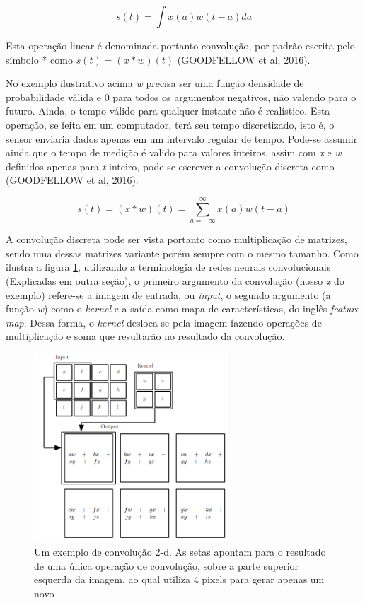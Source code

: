 \documentclass[12pt]{report}
\begin{document}
\begin{equation}
    s(t) = \int x(a)w(t - a)da
\end{equation}

Esta operação linear é denominada portanto convolução, por padrão escrita pelo símbolo * como $s(t) = (x * w) (t)$ (GOODFELLOW et al, 2016).

No exemplo ilustrativo acima \textit{w} precisa ser uma função densidade de probabilidade válida e 0 para todos os argumentos negativos, não valendo para o futuro. Ainda, o tempo válido para qualquer instante não é realístico. Esta operação, se feita em um computador, terá seu tempo discretizado, isto é, o sensor enviaria dados apenas em um intervalo regular de tempo. Pode-se assumir ainda que o tempo de medição é valido para valores inteiros, assim com \textit{x} e \textit{w} definidos apenas para \textit{t} inteiro, pode-se escrever a convolução discreta como (GOODFELLOW et al, 2016):

\begin{equation}
    s(t) = (x*w)(t) = \sum_{a = -\infty}^\infty x(a)w(t - a)
\end{equation}

A convolução discreta pode ser vista portanto como multiplicação de matrizes, sendo uma dessas matrizes variante porém sempre com o mesmo tamanho. Como ilustra a figura \ref{fig:convo}, utilizando a terminologia de redes neurais convolucionais (Explicadas em outra seção), o primeiro argumento da convolução (nosso \textit{x} do exemplo) refere-se a imagem de entrada, ou \textit{input}, o segundo argumento (a função \textit{w}) como o \textit{kernel} e a saída como mapa de características, do inglês \textit{feature map}. Dessa forma, o \textit{kernel} desloca-se pela imagem fazendo operações de multiplicação e soma que resultarão no resultado da convolução. 

\begin{figure}
    \centering
    \includegraphics[width=0.65\textwidth]{images/convo.png}
    \caption{Um exemplo de convolução 2-d. As setas apontam para o resultado de uma única operação de convolução, sobre a parte superior esquerda da imagem, ao qual utiliza 4 pixels para gerar apenas um novo}
    \label{fig:convo}
\end{figure}
\end{document}
